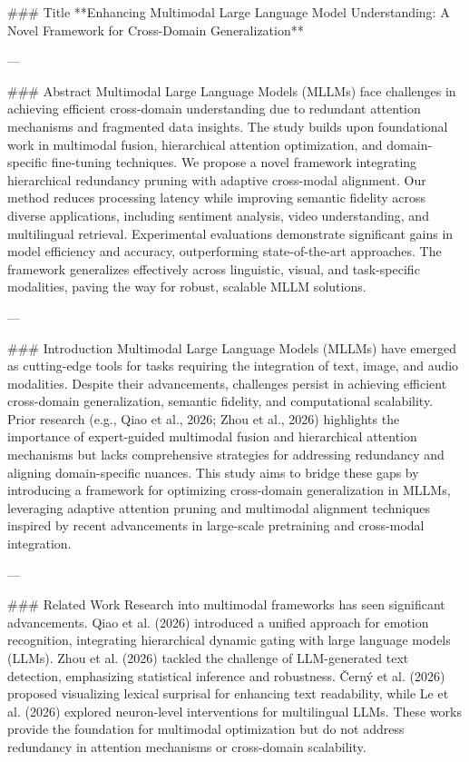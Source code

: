 ### Title
**Enhancing Multimodal Large Language Model Understanding: A Novel Framework for Cross-Domain Generalization**

---

### Abstract
Multimodal Large Language Models (MLLMs) face challenges in achieving efficient cross-domain understanding due to redundant attention mechanisms and fragmented data insights. The study builds upon foundational work in multimodal fusion, hierarchical attention optimization, and domain-specific fine-tuning techniques. We propose a novel framework integrating hierarchical redundancy pruning with adaptive cross-modal alignment. Our method reduces processing latency while improving semantic fidelity across diverse applications, including sentiment analysis, video understanding, and multilingual retrieval. Experimental evaluations demonstrate significant gains in model efficiency and accuracy, outperforming state-of-the-art approaches. The framework generalizes effectively across linguistic, visual, and task-specific modalities, paving the way for robust, scalable MLLM solutions.

---

### Introduction
Multimodal Large Language Models (MLLMs) have emerged as cutting-edge tools for tasks requiring the integration of text, image, and audio modalities. Despite their advancements, challenges persist in achieving efficient cross-domain generalization, semantic fidelity, and computational scalability. Prior research (e.g., Qiao et al., 2026; Zhou et al., 2026) highlights the importance of expert-guided multimodal fusion and hierarchical attention mechanisms but lacks comprehensive strategies for addressing redundancy and aligning domain-specific nuances. This study aims to bridge these gaps by introducing a framework for optimizing cross-domain generalization in MLLMs, leveraging adaptive attention pruning and multimodal alignment techniques inspired by recent advancements in large-scale pretraining and cross-modal integration.

---

### Related Work
Research into multimodal frameworks has seen significant advancements. Qiao et al. (2026) introduced a unified approach for emotion recognition, integrating hierarchical dynamic gating with large language models (LLMs). Zhou et al. (2026) tackled the challenge of LLM-generated text detection, emphasizing statistical inference and robustness. Černý et al. (2026) proposed visualizing lexical surprisal for enhancing text readability, while Le et al. (2026) explored neuron-level interventions for multilingual LLMs. These works provide the foundation for multimodal optimization but do not address redundancy in attention mechanisms or cross-domain scalability.

